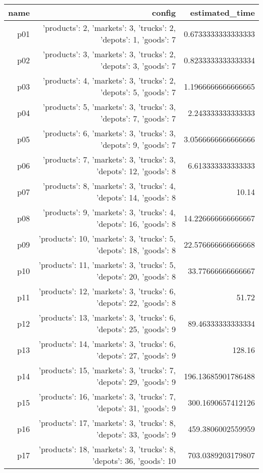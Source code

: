 \documentclass{article}
\begin{document}
                            \begin{center}
                            \scriptsize
                            \begin{tabular}{r|r|r}
                            name & config & estimated\_time\\\midrule
                              p01&{'products': 2, 'markets': 3, 'trucks': 2, 'depots': 1, 'goods': 7}&0.6733333333333333\\
  p02&{'products': 3, 'markets': 3, 'trucks': 2, 'depots': 3, 'goods': 7}&0.8233333333333334\\
  p03&{'products': 4, 'markets': 3, 'trucks': 2, 'depots': 5, 'goods': 7}&1.1966666666666665\\
  p04&{'products': 5, 'markets': 3, 'trucks': 3, 'depots': 7, 'goods': 7}&2.243333333333333\\
  p05&{'products': 6, 'markets': 3, 'trucks': 3, 'depots': 9, 'goods': 7}&3.0566666666666666\\
  p06&{'products': 7, 'markets': 3, 'trucks': 3, 'depots': 12, 'goods': 8}&6.613333333333333\\
  p07&{'products': 8, 'markets': 3, 'trucks': 4, 'depots': 14, 'goods': 8}&10.14\\
  p08&{'products': 9, 'markets': 3, 'trucks': 4, 'depots': 16, 'goods': 8}&14.226666666666667\\
  p09&{'products': 10, 'markets': 3, 'trucks': 5, 'depots': 18, 'goods': 8}&22.576666666666668\\
  p10&{'products': 11, 'markets': 3, 'trucks': 5, 'depots': 20, 'goods': 8}&33.77666666666667\\
  p11&{'products': 12, 'markets': 3, 'trucks': 6, 'depots': 22, 'goods': 8}&51.72\\
  p12&{'products': 13, 'markets': 3, 'trucks': 6, 'depots': 25, 'goods': 9}&89.46333333333334\\
  p13&{'products': 14, 'markets': 3, 'trucks': 6, 'depots': 27, 'goods': 9}&128.16\\
  p14&{'products': 15, 'markets': 3, 'trucks': 7, 'depots': 29, 'goods': 9}&196.13685901786488\\
  p15&{'products': 16, 'markets': 3, 'trucks': 7, 'depots': 31, 'goods': 9}&300.1690657412126\\
  p16&{'products': 17, 'markets': 3, 'trucks': 8, 'depots': 33, 'goods': 9}&459.3806002559959\\
  p17&{'products': 18, 'markets': 3, 'trucks': 8, 'depots': 36, 'goods': 10}&703.0389203179807\\

\end{tabular}
\end{center}
\end{document}
